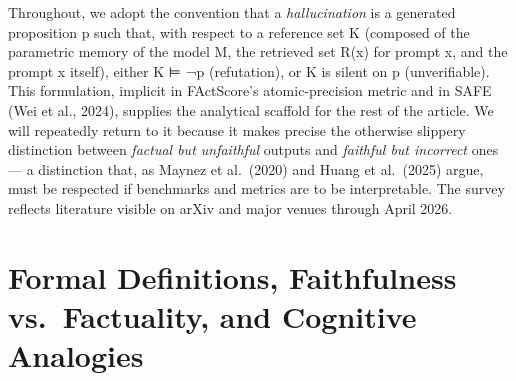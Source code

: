 Throughout, we adopt the convention that a \emph{hallucination} is a generated proposition p such that, with respect to a reference set K (composed of the parametric memory of the model M, the retrieved set R(x) for prompt x, and the prompt x itself), either K ⊨ ¬p (refutation), or K is silent on p (unverifiable). This formulation, implicit in FActScore's atomic-precision metric and in SAFE (Wei et al., 2024), supplies the analytical scaffold for the rest of the article. We will repeatedly return to it because it makes precise the otherwise slippery distinction between \emph{factual but unfaithful} outputs and \emph{faithful but incorrect} ones --- a distinction that, as Maynez et al.~(2020) and Huang et al.~(2025) argue, must be respected if benchmarks and metrics are to be interpretable. The survey reflects literature visible on arXiv and major venues through April 2026.

\section{Formal Definitions, Faithfulness vs.~Factuality, and Cognitive Analogies}\label{formal-definitions-faithfulness-vs.-factuality-and-cognitive-analogies}

